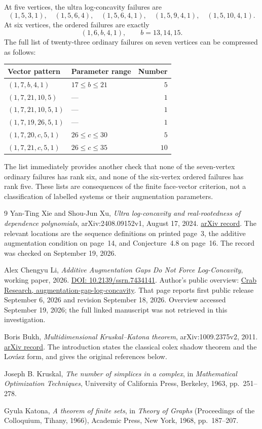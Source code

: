 \documentclass[11pt,letterpaper]{article}
\numberwithin{equation}{section}
\theoremstyle{definition}
\theoremstyle{remark}
\begin{document}
At five vertices, the ultra log-concavity failures are
\[
 (1,5,3,1),\quad(1,5,6,4),\quad(1,5,6,4,1),\quad
 (1,5,9,4,1),\quad(1,5,10,4,1).
\]
At six vertices, the ordered failures are exactly
\[
 (1,6,b,4,1),\qquad b=13,14,15.
\]
The full list of twenty-three ordinary failures on seven vertices can be
compressed as follows:
\begin{center}
\begin{tabular}{@{}l l r@{}}
\toprule
Vector pattern & Parameter range & Number\\
\midrule
$(1,7,b,4,1)$ & $17\le b\le21$ & $5$\\
$(1,7,21,10,5)$ & --- & $1$\\
$(1,7,21,10,5,1)$ & --- & $1$\\
$(1,7,19,26,5,1)$ & --- & $1$\\
$(1,7,20,c,5,1)$ & $26\le c\le30$ & $5$\\
$(1,7,21,c,5,1)$ & $26\le c\le35$ & $10$\\
\bottomrule
\end{tabular}
\end{center}
The list immediately provides another check that none of the seven-vertex
ordinary failures has rank six, and none of the six-vertex ordered
failures has rank five. These lists are consequences of the finite
face-vector criterion, not a classification of labelled systems or their
augmentation parameters.

\begin{thebibliography}{9}
Yan-Ting Xie and Shou-Jun Xu,
\emph{Ultra log-concavity and real-rootedness of dependence polynomials},
arXiv:2408.09152v1, August 17, 2024.
\href{https://arxiv.org/abs/2408.09152}{arXiv record}.
The relevant locations are the sequence definitions on printed page~3,
the additive augmentation condition on page~14, and Conjecture~4.8 on
page~16. The record was checked on September 19, 2026.

Alex Chengyu Li,
\emph{Additive Augmentation Gaps Do Not Force Log-Concavity},
working paper, 2026.
\href{https://doi.org/10.2139/ssrn.7434141}{DOI: 10.2139/ssrn.7434141}.
Author's public overview:
\href{https://crabresearch.com/research/augmentation-gap-log-concavity?lang=en}{Crab Research, augmentation-gap-log-concavity}.
That page reports first public release September 6, 2026 and revision
September 18, 2026. Overview accessed September 19, 2026; the full linked
manuscript was not retrieved in this investigation.

Boris Bukh,
\emph{Multidimensional Kruskal--Katona theorem},
arXiv:1009.2375v2, 2011.
\href{https://arxiv.org/abs/1009.2375}{arXiv record}.
The introduction states the classical colex shadow theorem and the
Lov\'asz form, and gives the original references below.

Joseph B. Kruskal,
\emph{The number of simplices in a complex},
in \emph{Mathematical Optimization Techniques},
University of California Press, Berkeley, 1963, pp.~251--278.

Gyula Katona,
\emph{A theorem of finite sets},
in \emph{Theory of Graphs} (Proceedings of the Colloquium, Tihany, 1966),
Academic Press, New York, 1968, pp.~187--207.
\end{thebibliography}
\end{document}
